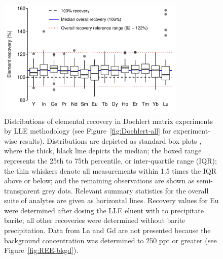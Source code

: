 \begin{figure}[htbp]
\begin{center}
\includegraphics[width=0.8\textwidth]{Ch4_figures/Doehlert-results.pdf}
\caption{Distributions of elemental recovery in Doehlert matrix experiments by LLE methodology (see Figure~\ref{fig:Doehlert-all} for experiment-wise results). Distributions are depicted as standard box plots \citep{boxplots},
where the thick, black line depicts the median;
the boxed range represents the 25th to 75th percentile, or inter-quartile range (IQR);
the thin whiskers denote all measurements within 1.5 times the IQR above or below;
and the remaining observations are shown as semi-transparent grey dots.
Relevant summary statistics for the overall suite of analytes are given as horizontal lines.
Recovery values for Eu were determined after dosing the LLE eluent with  to precipitate barite;
all other recoveries were determined without barite precipitation.
Data from La and Gd are not presented because the background concentration was determined to 250 ppt or greater (see Figure~\ref{fig:REE-bkgd}).}
\label{fig:Doehlert-summary}
\end{center}
\end{figure}

